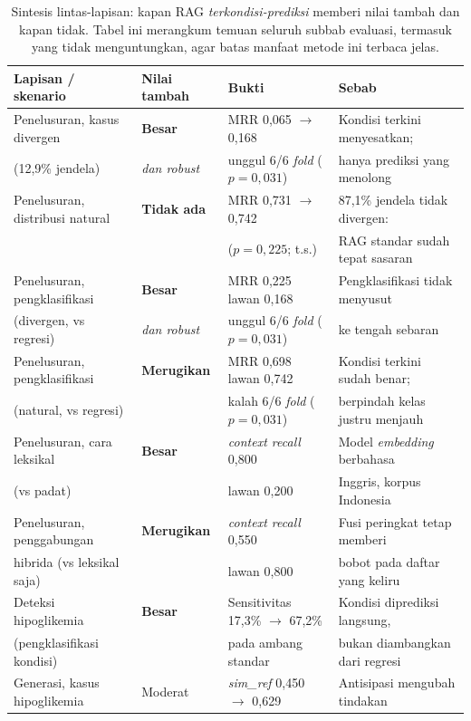 \begin{table}[htbp]
\centering
\caption{Sintesis lintas-lapisan: kapan RAG \emph{terkondisi-prediksi} memberi nilai tambah dan kapan tidak. Tabel ini merangkum temuan seluruh subbab evaluasi, termasuk yang tidak menguntungkan, agar batas manfaat metode ini terbaca jelas.}
\label{tab:sintesis}
\small
\begin{tabular}{@{}llll@{}}
\toprule
\textbf{Lapisan / skenario} & \textbf{Nilai tambah} & \textbf{Bukti} & \textbf{Sebab} \\
\midrule
Penelusuran, kasus divergen & \textbf{Besar} & MRR 0,065 $\rightarrow$ 0,168 & Kondisi terkini menyesatkan; \\
(12,9\% jendela) & \emph{dan robust} & unggul 6/6 \emph{fold} ($p=0{,}031$) & hanya prediksi yang menolong \\
\addlinespace
Penelusuran, distribusi natural & \textbf{Tidak ada} & MRR 0,731 $\rightarrow$ 0,742 & 87,1\% jendela tidak divergen: \\
& & ($p=0{,}225$; t.s.) & RAG standar sudah tepat sasaran \\
\addlinespace
Penelusuran, pengklasifikasi & \textbf{Besar} & MRR 0,225 lawan 0,168 & Pengklasifikasi tidak menyusut \\
(divergen, vs regresi) & \emph{dan robust} & unggul 6/6 \emph{fold} ($p=0{,}031$) & ke tengah sebaran \\
\addlinespace
Penelusuran, pengklasifikasi & \textbf{Merugikan} & MRR 0,698 lawan 0,742 & Kondisi terkini sudah benar; \\
(natural, vs regresi) & & kalah 6/6 \emph{fold} ($p=0{,}031$) & berpindah kelas justru menjauh \\
\addlinespace
Penelusuran, cara leksikal & \textbf{Besar} & \emph{context recall} 0,800 & Model \emph{embedding} berbahasa \\
(vs padat) & & lawan 0,200 & Inggris, korpus Indonesia \\
\addlinespace
Penelusuran, penggabungan & \textbf{Merugikan} & \emph{context recall} 0,550 & Fusi peringkat tetap memberi \\
hibrida (vs leksikal saja) & & lawan 0,800 & bobot pada daftar yang keliru \\
\midrule
Deteksi hipoglikemia & \textbf{Besar} & Sensitivitas 17,3\% $\rightarrow$ 67,2\% & Kondisi diprediksi langsung, \\
(pengklasifikasi kondisi) & & pada ambang standar & bukan diambangkan dari regresi \\
\midrule
Generasi, kasus hipoglikemia & Moderat & \emph{sim\_ref} 0,450 $\rightarrow$ 0,629 & Antisipasi mengubah tindakan \\

\end{tabular}
\end{table}
